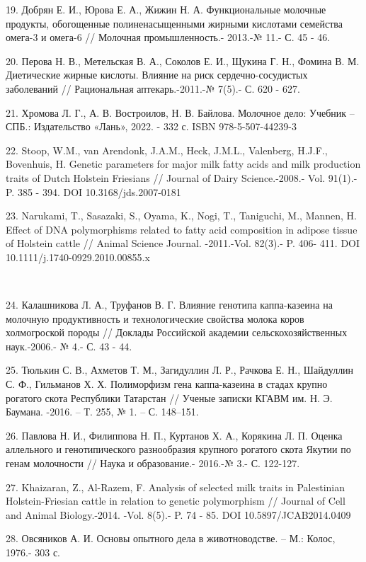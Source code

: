 19. Добрян Е. И., Юрова Е. А., Жижин Н. А. Функциональные молочные
продукты, обогощенные полиненасыщенными жирными кислотами семейства
омега-3 и омега-6 // Молочная промышленность.- 2013.-№ 11.- С. 45 - 46.

20. Перова Н. В., Метельская В. А., Соколов Е. И., Щукина Г. Н., Фомина
В. М. Диетические жирные кислоты. Влияние на риск сердечно-сосудистых
заболеваний // Рациональная аптекарь.-2011.-№ 7(5).- С. 620 - 627.

21. Хромова Л. Г., А. В. Востроилов, Н. В. Байлова. Молочное дело:
Учебник -- СПБ.: Издательство «Лань», 2022. - 332 с. ISBN
978-5-507-44239-3

22. Stoop, W.M., van Arendonk, J.A.M., Heck, J.M.L., Valenberg, H.J.F.,
Bovenhuis, H. Genetic parameters for major milk fatty acids and milk
production traits of Dutch Holstein Friesians // Journal of Dairy
Science.-2008.- Vol. 91(1).-P. 385 - 394. DOI 10.3168/jds.2007-0181

23. Narukami, T., Sasazaki, S., Oyama, K., Nogi, T., Taniguchi, M.,
Mannen, H. Effect of DNA polymorphisms related to fatty acid composition
in adipose tissue of Holstein cattle // Animal Science Journal.
-2011.-Vol. 82(3).- P. 406- 411. DOI 10.1111/j.1740-0929.2010.00855.x

~

24. Калашникова Л. А., Труфанов В. Г. Влияние генотипа каппа-казеина на
молочную продуктивность и технологические свойства молока коров
холмогроской породы // Доклады Российской академии сельскохозяйственных
наук.-2006.- № 4.- С. 43 - 44.

25. Тюлькин С. В., Ахметов Т. М., Загидуллин Л. Р., Рачкова Е. Н.,
Шайдуллин С. Ф., Гильманов Х. Х. Полиморфизм гена каппа-казеина в стадах
крупно рогатого скота Республики Татарстан // Ученые записки КГАВМ им.
Н. Э. Баумана. -2016. -- Т. 255, № 1. -- С. 148--151.

26. Павлова Н. И., Филиппова Н. П., Куртанов Х. А., Корякина Л. П.
Оценка аллельного и генотипического разнообразия крупного рогатого скота
Якутии по генам молочности // Наука и образование.- 2016.-№ 3.- С.
122-127.

27. Khaizaran, Z., Al-Razem, F. Analysis of selected milk traits in
Palestinian Holstein-Friesian cattle in relation to genetic polymorphism
// Journal of Cell and Animal Biology.-2014. -Vol. 8(5).- P. 74 - 85.
DOI 10.5897/JCAB2014.0409

28. Овсяников А. И. Основы опытного дела в животноводстве. -- М.: Колос,
1976.- 303 с.

